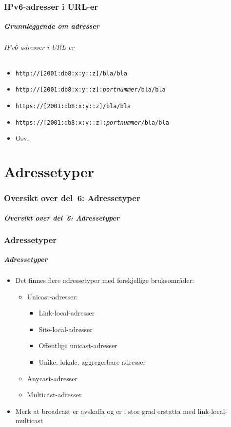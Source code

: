 \section{IPv6-adresser i URL-er}
\begin{frame}
  \frametitle{Grunnleggende om adresser}
  \framesubtitle{IPv6-adresser i URL-er}
  \begin{itemize}
  \item \texttt{http://[2001:db8:x:y::z]/bla/bla}
  \item \texttt{http://[2001:db8:x:y::z]:\textit{portnummer}/bla/bla}
  \item \texttt{https://[2001:db8:x:y::z]/bla/bla}
  \item \texttt{https://[2001:db8:x:y::z]:\textit{portnummer}/bla/bla}
  \item Osv.
  \end{itemize}
\end{frame}

\part{Adressetyper}

\begin{frame}
  \partpage
\end{frame}

\section*{Oversikt over del~6: Adressetyper}
\begin{frame}
  \frametitle{Oversikt over del~6: Adressetyper}
    \tableofcontents
\end{frame}

\section{Adressetyper}
\begin{frame}
  \frametitle{Adressetyper}
  \begin{itemize}
  \item Det finnes flere adressetyper med forskjellige bruksområder:
    \begin{itemize}
    \item Unicast-adresser:
      \begin{itemize}
      \item Link-local-adresser
      \item Site-local-adresser
      \item Offentlige unicast-adresser
      \item Unike, lokale, aggregerbare adresser
      \end{itemize}
    \item Anycast-adresser
    \item Multicast-adresser
    \end{itemize}
  \item Merk at broadcast er avskaffa og er i stor grad erstatta med
    link-local-multicast
  \end{itemize}
\end{frame}

